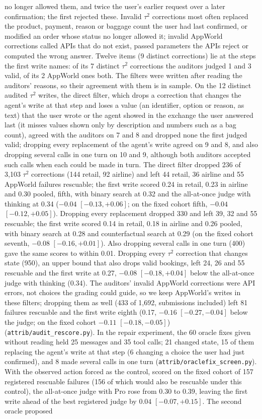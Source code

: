 \documentclass[11pt]{article}
\begin{document}
no longer allowed them, and twice the user's earlier request over a later confirmation; the first rejected these. Invalid $\tau^2$ corrections most often replaced the product, payment, reason or baggage count the user had last confirmed, or modified an order whose status no longer allowed it; invalid AppWorld corrections called APIs that do not exist, passed parameters the APIs reject or computed the wrong answer. Twelve items (9 distinct corrections) lie at the steps the first write names: of its 7 distinct $\tau^2$ corrections the auditors judged 1 and 3 valid, of its 2 AppWorld ones both. The filters were written after reading the auditors' reasons, so their agreement with them is in sample. On the 12 distinct audited $\tau^2$ writes, the direct filter, which drops a correction that changes the agent's write at that step and loses a value (an identifier, option or reason, as text) that the user wrote or the agent showed in the exchange the user answered last (it misses values shown only by description and numbers such as a bag count), agreed with the auditors on 7 and 8 and dropped none the first judged valid; dropping every replacement of the agent's write agreed on 9 and 8, and also dropping several calls in one turn on 10 and 9, although both auditors accepted such calls when each could be made in turn. The direct filter dropped 236 of 3{,}103 $\tau^2$ corrections (144 retail, 92 airline) and left 44 retail, 36 airline and 55 AppWorld failures rescuable; the first write scored 0.24 in retail, 0.23 in airline and 0.30 pooled, fifth, with binary search at 0.32 and the all-at-once judge with thinking at 0.34 ($-0.04$ $[-0.13,+0.06]$; on the fixed cohort fifth, $-0.04$ $[-0.12,+0.05]$). Dropping every replacement dropped 330 and left 39, 32 and 55 rescuable; the first write scored 0.14 in retail, 0.18 in airline and 0.26 pooled, with binary search at 0.28 and counterfactual search at 0.29 (on the fixed cohort seventh, $-0.08$ $[-0.16,+0.01]$). Also dropping several calls in one turn (400) gave the same scores to within 0.01. Dropping every $\tau^2$ correction that changes state (950), an upper bound that also drops valid bookings, left 24, 26 and 55 rescuable and the first write at 0.27, $-0.08$ $[-0.18,+0.04]$ below the all-at-once judge with thinking (0.34). The auditors' invalid AppWorld corrections were API errors, not choices the grading could guide, so we keep AppWorld's writes in these filters; dropping them as well (433 of 1{,}692, submissions included) left 81 failures rescuable and the first write eighth (0.17, $-0.16$ $[-0.27,-0.04]$ below the judge; on the fixed cohort $-0.11$ $[-0.18,-0.05]$) (\texttt{attrib/audit\_rescore.py}). In the repair experiment, the 60 oracle fixes given without reading held 25 messages and 35 tool calls; 21 changed state, 15 of them replacing the agent's write at that step (6 changing a choice the user had just confirmed), and 8 made several calls in one turn (\texttt{attrib/oraclefix\_screen.py}). With the observed action forced as the control, scored on the fixed cohort of 157 registered rescuable failures (156 of which would also be rescuable under this control), the all-at-once judge with Pro rose from 0.30 to 0.39, leaving the first write ahead of the best registered judge by $0.04$ $[-0.07,+0.15]$. The second oracle proposed 
\end{document}
